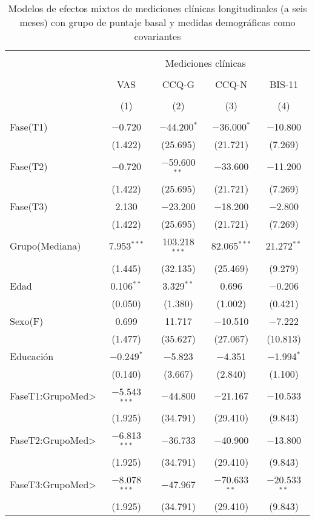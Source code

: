 \begin{table}[!htbp] \centering
    \small
  \caption{Modelos de efectos mixtos de mediciones clínicas longitudinales (a seis meses) con grupo de puntaje basal y medidas demográficas como covariantes}
  \label{tab:clin3}
\begin{tabular}{@{\extracolsep{5pt}}lcccc}
\\[-1.8ex]\hline
\hline \\[-1.8ex]
 & \multicolumn{4}{c}{Mediciones clínicas } \\
\cline{2-5}
\\[-1.8ex] & VAS & CCQ-G & CCQ-N & BIS-11\\
\\[-1.8ex] & (1) & (2) & (3) & (4)\\
\hline \\[-1.8ex]
  Fase(T1) & $-$0.720 & $-$44.200$^{*}$ & $-$36.000$^{*}$ & $-$10.800 \\
  & (1.422) & (25.695) & (21.721) & (7.269) \\
  Fase(T2) & $-$0.720 & $-$59.600$^{**}$ & $-$33.600 & $-$11.200 \\
  & (1.422) & (25.695) & (21.721) & (7.269) \\
  Fase(T3) & 2.130 & $-$23.200 & $-$18.200 & $-$2.800 \\
  & (1.422) & (25.695) & (21.721) & (7.269) \\
  Grupo(Mediana) & 7.953$^{***}$ & 103.218$^{***}$ & 82.065$^{***}$ & 21.272$^{**}$ \\
  & (1.445) & (32.135) & (25.469) & (9.279) \\
  Edad & 0.106$^{**}$ & 3.329$^{**}$ & 0.696 & $-$0.206 \\
  & (0.050) & (1.380) & (1.002) & (0.421) \\
  Sexo(F) & 0.699 & 11.717 & $-$10.510 & $-$7.222 \\
  & (1.477) & (35.627) & (27.067) & (10.813) \\
  Educación & $-$0.249$^{*}$ & $-$5.823 & $-$4.351 & $-$1.994$^{*}$ \\
  & (0.140) & (3.667) & (2.840) & (1.100) \\
  FaseT1:GrupoMed\textgreater  & $-$5.543$^{***}$ & $-$44.800 & $-$21.167 & $-$10.533 \\
  & (1.925) & (34.791) & (29.410) & (9.843) \\
  FaseT2:GrupoMed\textgreater  & $-$6.813$^{***}$ & $-$36.733 & $-$40.900 & $-$13.800 \\
  & (1.925) & (34.791) & (29.410) & (9.843) \\
  FaseT3:GrupoMed\textgreater  & $-$8.078$^{***}$ & $-$47.967 & $-$70.633$^{**}$ & $-$20.533$^{**}$ \\
  & (1.925) & (34.791) & (29.410) & (9.843) \\


\end{tabular}
\end{table}
